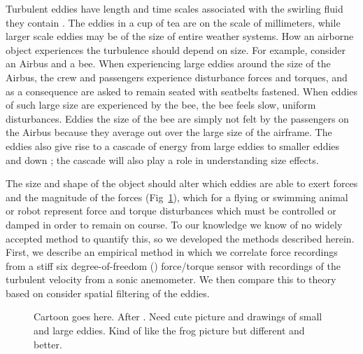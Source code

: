 Turbulent eddies have length and time scales associated with the swirling fluid they contain \cite{Tennekes:1972,Davidson:2004}.  The eddies in a cup of tea are on the scale of millimeters, while larger scale eddies may be of the size of entire weather systems.  How an airborne object experiences the turbulence should depend on size.  For example, consider an Airbus and a bee.  When experiencing large eddies around the size of the Airbus, the crew and passengers experience disturbance forces and torques, and as a consequence are asked to remain seated with seatbelts fastened.  When eddies of such large size are experienced by the bee, the bee feels slow, uniform disturbances.  Eddies the size of the bee are simply not felt by the passengers on the Airbus because they average out over the large size of the airframe. The eddies also give rise to a cascade of energy from large eddies to smaller eddies and down \cite{Davidson:2004, someone}; the cascade will also play a role in understanding size effects. 

The size and shape of the object should alter which eddies are able to exert forces and the magnitude of the forces (Fig~\ref{fig:cartoon}), which for a flying or swimming animal or robot represent force and torque disturbances which must be controlled or damped in order to remain on course.  To our knowledge we know of no widely accepted method to quantify this, so we developed the methods described herein.  First, we describe an empirical method in which we correlate force recordings from a stiff six degree-of-freedom (\sixDOF) force/torque sensor with recordings of the turbulent velocity from a sonic anemometer.  We then compare this to theory based on consider spatial filtering of the eddies. 

\begin{figure} 
\caption{Cartoon goes here. After \citep{McCay:2003}. Need cute picture and drawings of small and large eddies.  Kind of like the frog picture but different and better.}
\label{fig:cartoon}
\end{figure}



